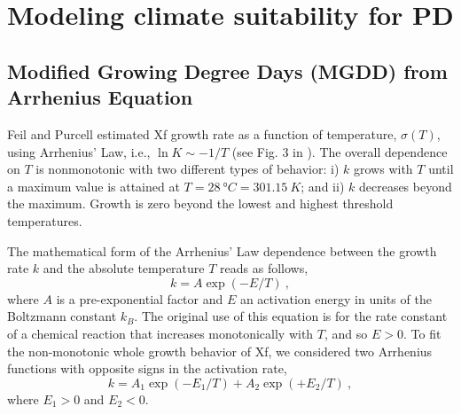 \section{Modeling climate suitability for PD}\label{app:S2}
\subsection{Modified Growing Degree Days (MGDD) from Arrhenius
    Equation}\label{app:MGDD} %

Feil and Purcell estimated Xf growth rate as a function of temperature,
$\sigma(T)$, using Arrhenius’ Law, i.e., $\ln K \sim -1/T$ (see Fig. 3 in
\cite{Feil2001}). The overall dependence on $T$ is nonmonotonic with two
different types of behavior: i) $k$ grows with $T$ until a maximum value is
attained at $T=\SI{28}{\degree C}=\SI{301.15}{K}$; and ii) $k$ decreases beyond
the maximum. Growth is zero beyond the lowest and highest threshold
temperatures.

The mathematical form of the Arrhenius' Law dependence between the growth
rate $k$ and the absolute temperature $T$ reads as follows,
\begin{equation}
    k = A \exp(-E/T) \ ,
\end{equation}
where $A$ is a pre-exponential factor and $E$ an activation energy in units
of the Boltzmann constant $k_B$. The original use of this equation is for the
rate constant of a chemical reaction that increases monotonically with $T$, and
so $E>0$.  To fit the non-monotonic whole growth behavior of Xf, we considered
two Arrhenius functions with opposite signs in the activation rate,
\begin{equation}\label{eq: Arrhenius_2}
    k =A_1 \exp(-E_1/T) + A_2 \exp(+E_2/T) \ ,
\end{equation}
where $E_1>0$ and $E_2<0$.\\

